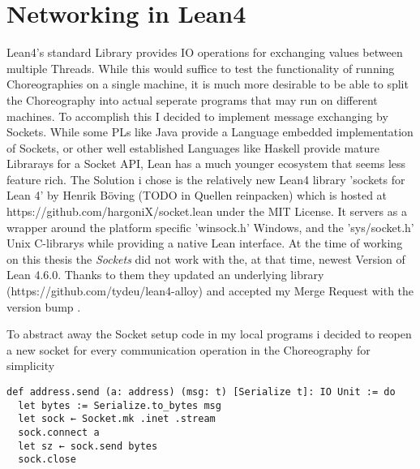 \section{Networking in Lean4}
Lean4's standard Library provides IO operations for exchanging values between multiple Threads. While this would suffice to test the functionality of running Choreographies on a single machine, it is much more desirable to be able to split the Choreography into actual seperate programs that may run on different machines. To accomplish this I decided to implement message exchanging by Sockets.
While some PLs like Java provide a Language embedded implementation of Sockets, or other well established Languages like Haskell provide mature Librarays for a Socket API, Lean has a much younger ecosystem that seems less feature rich. The Solution i chose is the relatively new Lean4 library 'sockets for Lean 4' by Henrik Böving (TODO in Quellen reinpacken) which is hosted at https://github.com/hargoniX/socket.lean under the MIT License. It servers as a wrapper around the platform specific 'winsock.h' Windows, and the 'sys/socket.h' Unix C-librarys while providing a native Lean interface. At the time of working on this thesis the \emph{Sockets} did not work with the, at that time, newest Version of Lean 4.6.0. Thanks to them they updated an underlying library (https://github.com/tydeu/lean4-alloy) and accepted my Merge Request with the version bump \cite{test}.
\par
To abstract away the Socket setup code in my local programs i decided to reopen a new socket for every communication operation in the Choreography for simplicity

\begin{lstlisting}[language=lean]
def address.send (a: address) (msg: t) [Serialize t]: IO Unit := do
  let bytes := Serialize.to_bytes msg
  let sock ← Socket.mk .inet .stream
  sock.connect a
  let sz ← sock.send bytes
  sock.close
\end{lstlisting}

